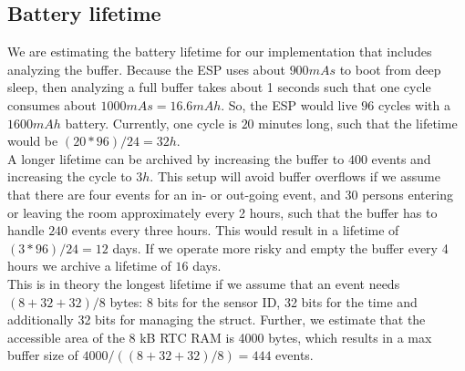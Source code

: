 \subsection{Battery lifetime}
We are estimating the battery lifetime for our implementation that includes analyzing the buffer.
Because the ESP uses about $900 mAs$ to boot from deep sleep, then analyzing a full buffer takes about
1 seconds such that one cycle consumes about $1000 mAs = 16.6 mAh$. So, the ESP would
live $96$ cycles with a $1600 mAh$ battery. Currently, one cycle is $20$ minutes long, such that the
lifetime would be $(20*96)/24 = 32 h$. \\
A longer lifetime can be archived by increasing the buffer to $400$
events and increasing the cycle to $3 h$. This setup will avoid buffer overflows if we assume that
there are four events for an in- or out-going event, and 30 persons entering or leaving the room
approximately every 2 hours, such that the buffer has to handle $240$ events every three hours.
This would result in a lifetime of $(3*96)/24 = 12$ days. If we operate more risky and
empty the buffer every 4 hours we archive a lifetime of $16$ days.\\
This is in theory the longest lifetime if we assume that an event needs $(8+32+32)/8$ bytes:
8 bits for the sensor ID, 32 bits for the time and additionally 32 bits for managing the struct.
Further, we estimate that the accessible area of the 8 kB RTC RAM is 4000 bytes, which
results in a max buffer size of $4000/((8+32+32)/8) = 444$ events.
